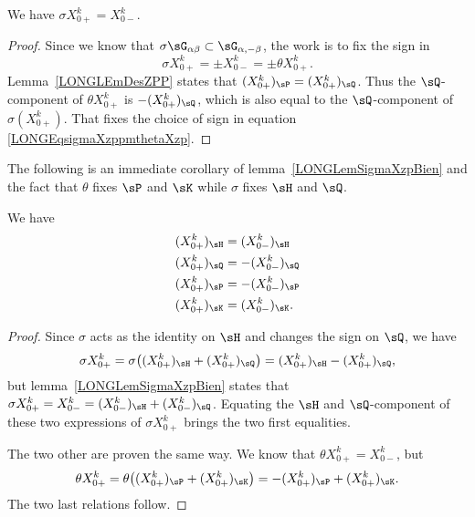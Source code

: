 \begin{lemma}				\label{LONGLemSigmaXzpBien}
	We have $\sigma X^k_{0+}=X^k_{0-}$.
\end{lemma}

\begin{proof}
	Since we know that $\sigma\sG_{\alpha\beta}\subset\sG_{\alpha,-\beta}$, the work is to fix the sign in
	\begin{equation}		\label{LONGEqsigmaXzppmthetaXzp}
		\sigma X^k_{0+}=\pm X^k_{0-}=\pm\theta X^k_{0+}.
	\end{equation}
	Lemma~\ref{LONGLEmDesZPP} states that $(X_{0+}^k)_{\sP}=(X_{0+}^k)_{\sQ}$. Thus the $\sQ$-component of $\theta X^k_{0+}$ is $-(X^k_{0+})_{\sQ}$, which is also equal to the $\sQ$-component of $\sigma(X^k_{0+})$. That  fixes the choice of sign in equation \eqref{LONGEqsigmaXzppmthetaXzp}.
\end{proof}

The following is an immediate corollary of lemma~\ref{LONGLemSigmaXzpBien} and the fact that $\theta$ fixes $\sP$ and $\sK$ while $\sigma$ fixes $\sH$ and $\sQ$.

\begin{corollary}		\label{LONGCorXzpHQPKXzm}
	We have
	\begin{subequations}
		\begin{align}
			(X^k_{0+})_{\sH} & =(X^k_{0-})_{\sH}  \\
			(X^k_{0+})_{\sQ} & =-(X^k_{0-})_{\sQ} \\
			(X^k_{0+})_{\sP} & =-(X^k_{0-})_{\sP} \\
			(X^k_{0+})_{\sK} & =(X^k_{0-})_{\sK}.
		\end{align}
	\end{subequations}
\end{corollary}

\begin{proof}
	Since $\sigma$ acts as the identity on $\sH$ and changes the sign on $\sQ$, we have
	\begin{equation}
		\sigma X^k_{0+}=\sigma\big(  (X^k_{0+})_{\sH}+(X^k_{0+})_{\sQ}  \big)=(X^k_{0+})_{\sH}-(X^k_{0+})_{\sQ},
	\end{equation}
	but lemma~\ref{LONGLemSigmaXzpBien} states that $\sigma X^k_{0+}=X^k_{0-}=(X^k_{0-})_{\sH}+(X^k_{0-})_{\sQ}$. Equating the $\sH$ and $\sQ$-component of these two expressions of $\sigma X^k_{0+}$ brings the two first equalities.

	The two other are proven the same way. We know that $\theta X^k_{0+}=X^k_{0-}$, but
	\begin{equation}
		\theta X^k_{0+}=\theta\big( (X^k_{0+})_{\sP}+(X^k_{0+})_{\sK} \big)=-(X^k_{0+})_{\sP}+(X^k_{0+})_{\sK}.
	\end{equation}
	The two last relations follow.
\end{proof}

